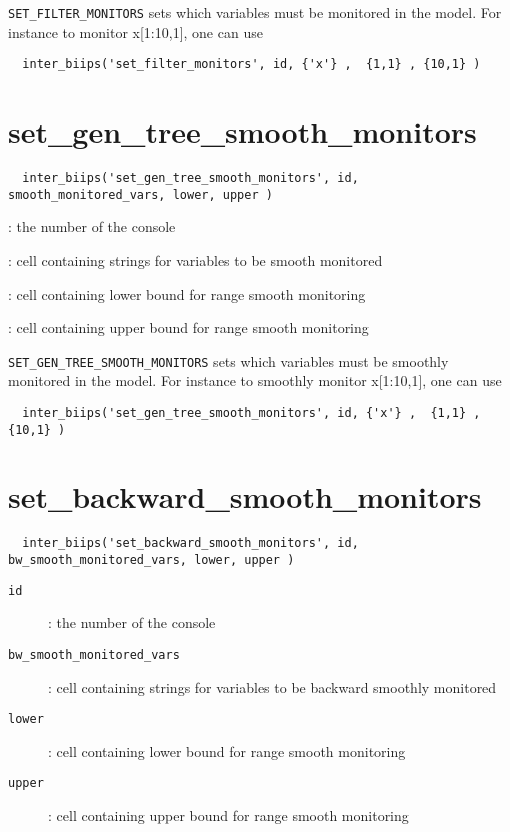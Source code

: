 \documentclass[11pt]{article}
\begin{document}
   \texttt{SET\_FILTER\_MONITORS} sets which variables must be monitored in the model. For instance to monitor x[1:10,1], one can use
 \begin{lstlisting}
  inter_biips('set_filter_monitors', id, {'x'} ,  {1,1} , {10,1} )
 \end{lstlisting}

\section{set\_gen\_tree\_smooth\_monitors}

 \begin{lstlisting}
  inter_biips('set_gen_tree_smooth_monitors', id, smooth_monitored_vars, lower, upper )
 \end{lstlisting}

   \begin{description}
   \setlength{\baselineskip}{0.1\baselineskip}
     \item[\texttt{id}] : the number of the console
     \item[\texttt{smooth\_monitored\_vars}] : cell containing strings for variables to be smooth monitored
     \item[\texttt{lower}] : cell containing lower bound for range smooth monitoring
     \item[\texttt{upper}] : cell containing upper bound for range smooth monitoring 
   
   \end{description}

   \texttt{SET\_GEN\_TREE\_SMOOTH\_MONITORS} sets which variables must be smoothly monitored in the model. For instance to smoothly monitor x[1:10,1], one can use
 \begin{lstlisting}
  inter_biips('set_gen_tree_smooth_monitors', id, {'x'} ,  {1,1} , {10,1} )
 \end{lstlisting}


\section{set\_backward\_smooth\_monitors}

 \begin{lstlisting}
  inter_biips('set_backward_smooth_monitors', id, bw_smooth_monitored_vars, lower, upper )
 \end{lstlisting}

   \begin{description}
     \item[\texttt{id}] : the number of the console
     \item[\texttt{bw\_smooth\_monitored\_vars}] : cell containing strings for variables to be backward smoothly monitored
     \item[\texttt{lower}] : cell containing lower bound for range smooth monitoring
     \item[\texttt{upper}] : cell containing upper bound for range smooth monitoring 
   
   \end{description}
\end{document}
